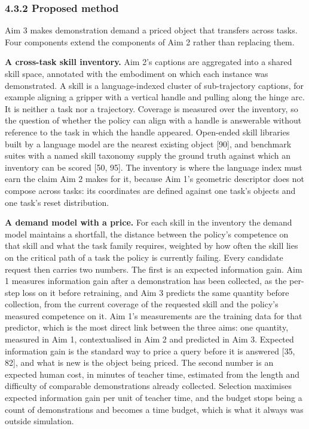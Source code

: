 \documentclass[
  11pt,
]{article}
\begin{document}
\hypertarget{proposed-method}{%
\subsubsection{4.3.2 Proposed method}\label{proposed-method}}

Aim 3 makes demonstration demand a priced object that transfers across
tasks. Four components extend the components of Aim 2 rather than
replacing them.

\textbf{A cross-task skill inventory.} Aim 2's captions are aggregated
into a shared skill space, annotated with the embodiment on which each
instance was demonstrated. A skill is a language-indexed cluster of
sub-trajectory captions, for example aligning a gripper with a vertical
handle and pulling along the hinge arc. It is neither a task nor a
trajectory. Coverage is measured over the inventory, so the question of
whether the policy can align with a handle is answerable without
reference to the task in which the handle appeared. Open-ended skill
libraries built by a language model are the nearest existing object
{[}90{]}, and benchmark suites with a named skill taxonomy supply the
ground truth against which an inventory can be scored {[}50, 95{]}. The
inventory is where the language index must earn the claim Aim 2 makes
for it, because Aim 1's geometric descriptor does not compose across
tasks: its coordinates are defined against one task's objects and one
task's reset distribution.

\textbf{A demand model with a price.} For each skill in the inventory
the demand model maintains a shortfall, the distance between the
policy's competence on that skill and what the task family requires,
weighted by how often the skill lies on the critical path of a task the
policy is currently failing. Every candidate request then carries two
numbers. The first is an expected information gain. Aim 1 measures
information gain after a demonstration has been collected, as the
per-step loss on it before retraining, and Aim 3 predicts the same
quantity before collection, from the current coverage of the requested
skill and the policy's measured competence on it. Aim 1's measurements
are the training data for that predictor, which is the most direct link
between the three aims: one quantity, measured in Aim 1, contextualised
in Aim 2 and predicted in Aim 3. Expected information gain is the
standard way to price a query before it is answered {[}35, 82{]}, and
what is new is the object being priced. The second number is an expected
human cost, in minutes of teacher time, estimated from the length and
difficulty of comparable demonstrations already collected. Selection
maximises expected information gain per unit of teacher time, and the
budget stops being a count of demonstrations and becomes a time budget,
which is what it always was outside simulation.
\end{document}
